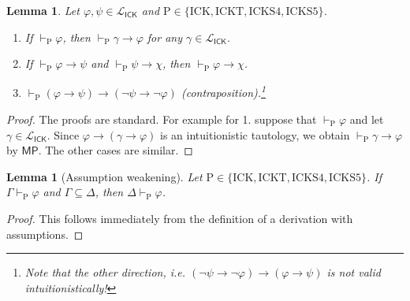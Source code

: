 \documentclass{myifcolog}
\newcommand{\ICK}{\mathsf{ICK}}
\newcommand{\LICK}{\mathcal{L}_{\ICK}}
\newcommand{\hick}{\mathrm{ICK}}
\newcommand{\hickt}{\mathrm{ICKT}}
\newcommand{\hicks}{\mathrm{ICKS4}}
\newcommand{\hickss}{\mathrm{ICKS5}}
\newcommand{\hickp}{\mathrm{P}}
\newtheorem{lemma}[theorem]{Lemma}
\numberwithin{theorem}{section}
\begin{document}
\begin{lemma}\label{l: derivable formulae}
    Let $\varphi, \psi \in \LICK$ and $\hickp \in \{\hick, \hickt, \hicks, \hickss\}$.
    \begin{enumerate}
    \item\label{l: derivable formulae item 1} If $\vdash_\hickp \varphi$, then $\vdash_\hickp \gamma \rightarrow \varphi$ for any $\gamma \in \LICK$.
    \item\label{l: derivable formulae item 2} If $\vdash_{\hickp} \varphi \rightarrow \psi$ and $\vdash_{\hickp} \psi \rightarrow \chi$, then $\vdash_{\hickp} \varphi \rightarrow \chi$.
    \item\label{l: derivable formulae item 3} $\vdash_\hickp (\varphi \rightarrow \psi) \rightarrow (\neg \psi \rightarrow \neg \varphi)$ (contraposition).\footnote{Note that the other direction, i.e. $(\neg \psi \rightarrow \neg \varphi) \rightarrow (\varphi \rightarrow \psi)$ is \emph{not} valid intuitionistically!}
    \end{enumerate}
\end{lemma}
\begin{proof}
    The proofs are standard. For example for 1. suppose that $\vdash_\hickp \varphi$ and let $\gamma \in \LICK$. Since $\varphi \rightarrow (\gamma \rightarrow \varphi)$ is an intuitionistic tautology, we obtain $\vdash_\hickp \gamma \rightarrow \varphi$ by $\mathsf{MP}$. The other cases are similar.
\end{proof}


\begin{lemma}[Assumption weakening] \label{l: assumption weakening}
    Let $\hickp \in \{\hick, \hickt, \hicks, \hickss\}$. If $\Gamma \vdash_\mathrm{P} \varphi$ and $\Gamma \subseteq \Delta$, then $\Delta \vdash_\mathrm{P} \varphi$.
\end{lemma}
\begin{proof}
    This follows immediately from the definition of a derivation with assumptions.
\end{proof}
\end{document}

